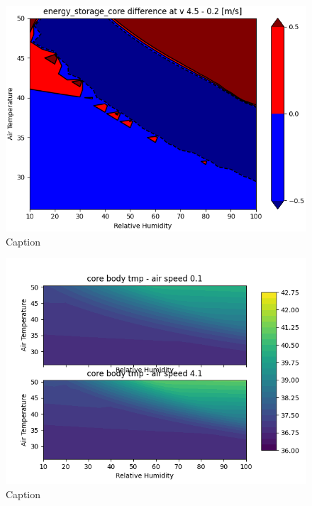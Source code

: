 \begin{figure}
    \centering
    \includegraphics[width=\textwidth]{figures/energy_storage_delta.png}
    \caption{Caption}
    \label{fig:energy_storage_delta}
\end{figure}

\begin{figure}
    \centering
    \includegraphics[width=\textwidth]{figures/core_body_tmp.png}
    \caption{Caption}
    \label{fig:core_body_tmp}
\end{figure}


